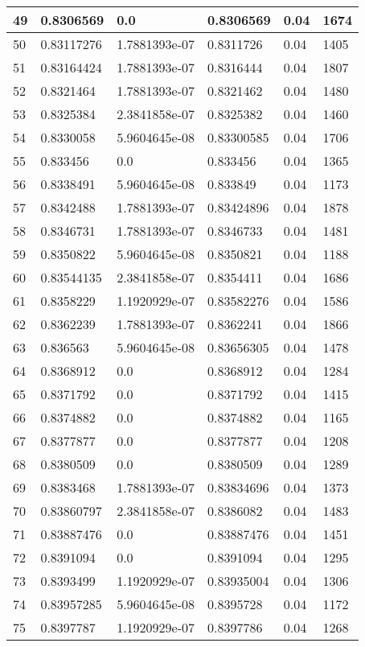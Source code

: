 \begin{longtable}{|l|l|l|l|l|l|}
49 & 0.8306569 & 0.0 & 0.8306569 & 0.04 & 1674 \\ \hline 
50 & 0.83117276 & 1.7881393e-07 & 0.8311726 & 0.04 & 1405 \\ \hline 
51 & 0.83164424 & 1.7881393e-07 & 0.8316444 & 0.04 & 1807 \\ \hline 
52 & 0.8321464 & 1.7881393e-07 & 0.8321462 & 0.04 & 1480 \\ \hline 
53 & 0.8325384 & 2.3841858e-07 & 0.8325382 & 0.04 & 1460 \\ \hline 
54 & 0.8330058 & 5.9604645e-08 & 0.83300585 & 0.04 & 1706 \\ \hline 
55 & 0.833456 & 0.0 & 0.833456 & 0.04 & 1365 \\ \hline 
56 & 0.8338491 & 5.9604645e-08 & 0.833849 & 0.04 & 1173 \\ \hline 
57 & 0.8342488 & 1.7881393e-07 & 0.83424896 & 0.04 & 1878 \\ \hline 
58 & 0.8346731 & 1.7881393e-07 & 0.8346733 & 0.04 & 1481 \\ \hline 
59 & 0.8350822 & 5.9604645e-08 & 0.8350821 & 0.04 & 1188 \\ \hline 
60 & 0.83544135 & 2.3841858e-07 & 0.8354411 & 0.04 & 1686 \\ \hline 
61 & 0.8358229 & 1.1920929e-07 & 0.83582276 & 0.04 & 1586 \\ \hline 
62 & 0.8362239 & 1.7881393e-07 & 0.8362241 & 0.04 & 1866 \\ \hline 
63 & 0.836563 & 5.9604645e-08 & 0.83656305 & 0.04 & 1478 \\ \hline 
64 & 0.8368912 & 0.0 & 0.8368912 & 0.04 & 1284 \\ \hline 
65 & 0.8371792 & 0.0 & 0.8371792 & 0.04 & 1415 \\ \hline 
66 & 0.8374882 & 0.0 & 0.8374882 & 0.04 & 1165 \\ \hline 
67 & 0.8377877 & 0.0 & 0.8377877 & 0.04 & 1208 \\ \hline 
68 & 0.8380509 & 0.0 & 0.8380509 & 0.04 & 1289 \\ \hline 
69 & 0.8383468 & 1.7881393e-07 & 0.83834696 & 0.04 & 1373 \\ \hline 
70 & 0.83860797 & 2.3841858e-07 & 0.8386082 & 0.04 & 1483 \\ \hline 
71 & 0.83887476 & 0.0 & 0.83887476 & 0.04 & 1451 \\ \hline 
72 & 0.8391094 & 0.0 & 0.8391094 & 0.04 & 1295 \\ \hline 
73 & 0.8393499 & 1.1920929e-07 & 0.83935004 & 0.04 & 1306 \\ \hline 
74 & 0.83957285 & 5.9604645e-08 & 0.8395728 & 0.04 & 1172 \\ \hline 
75 & 0.8397787 & 1.1920929e-07 & 0.8397786 & 0.04 & 1268 \\ \hline 
\end{longtable}
